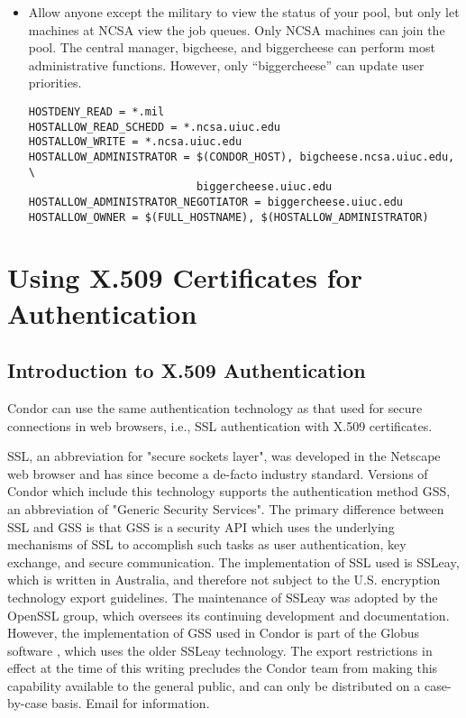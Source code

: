 \begin{itemize}
\item Allow anyone except the military to view the status of your
pool, but only let machines at NCSA view the job queues.  Only NCSA
machines can join the pool. The central manager, bigcheese, and
biggercheese can perform most administrative functions.  However, only
``biggercheese'' can update user priorities.
\begin{verbatim}
HOSTDENY_READ = *.mil
HOSTALLOW_READ_SCHEDD = *.ncsa.uiuc.edu 
HOSTALLOW_WRITE = *.ncsa.uiuc.edu
HOSTALLOW_ADMINISTRATOR = $(CONDOR_HOST), bigcheese.ncsa.uiuc.edu, \
                          biggercheese.uiuc.edu
HOSTALLOW_ADMINISTRATOR_NEGOTIATOR = biggercheese.uiuc.edu
HOSTALLOW_OWNER = $(FULL_HOSTNAME), $(HOSTALLOW_ADMINISTRATOR)
\end{verbatim}

\end{itemize}

\section{\label{sec:X509-Authentication}Using X.509 Certificates for
Authentication} 

\subsection{\label{sec:General-X509-Authentication}Introduction to X.509 
Authentication}

Condor can use the same authentication technology as that used for secure
connections in web browsers, i.e., SSL authentication with X.509 certificates.

SSL, an abbreviation for "secure sockets layer", was developed in the 
Netscape web browser and has since become a de-facto industry standard.
Versions of Condor which include this technology supports the authentication
method GSS, an abbreviation of "Generic Security Services". The
primary difference between SSL and GSS is that GSS is a security API which
uses the underlying mechanisms of SSL to accomplish such tasks as user
authentication, key exchange, and secure communication. The implementation
of SSL used is SSLeay, which is written in Australia, and therefore not
subject to the U.S. encryption technology export guidelines. The maintenance
of SSLeay was adopted by the OpenSSL group, which oversees its continuing
development and documentation. However, the implementation of GSS used in
Condor is part of the Globus software \Url{http://www.globus.org}, which uses the 
older SSLeay technology. The export restrictions in effect at the time of
this writing precludes the Condor team from making this capability available
to the general public, and can only be distributed on a case-by-case basis.
Email \Email{condor-admin@cs.wisc.edu} for information.

